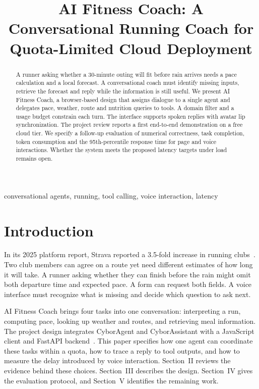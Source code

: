 \documentclass[conference]{IEEEtran}
\begin{document}
\title{AI Fitness Coach: A Conversational Running Coach for Quota-Limited Cloud Deployment}
\author{}
\maketitle
\begin{abstract}
A runner asking whether a 30-minute outing will fit before rain arrives needs a pace calculation and a local forecast. A conversational coach must identify missing inputs, retrieve the forecast and reply while the information is still useful. We present AI Fitness Coach, a browser-based design that assigns dialogue to a single agent and delegates pace, weather, route and nutrition queries to tools. A domain filter and a usage budget constrain each turn. The interface supports spoken replies with avatar lip synchronization. The project review reports a first end-to-end demonstration on a free cloud tier. We specify a follow-up evaluation of numerical correctness, task completion, token consumption and the 95th-percentile response time for page and voice interactions. Whether the system meets the proposed latency targets under load remains open.
\end{abstract}
\begin{IEEEkeywords}
conversational agents, running, tool calling, voice interaction, latency
\end{IEEEkeywords}
\section{Introduction}
In its 2025 platform report, Strava reported a 3.5-fold increase in running clubs~\cite{strava}. Two club members can agree on a route yet need different estimates of how long it will take. A runner asking whether they can finish before the rain might omit both departure time and expected pace. A form can request both fields. A voice interface must recognize what is missing and decide which question to ask next.

AI Fitness Coach brings four tasks into one conversation: interpreting a run, computing pace, looking up weather and routes, and retrieving meal information. The project design integrates CyborAgent and CyborAssistant with a JavaScript client and FastAPI backend~\cite{project}. This paper specifies how one agent can coordinate these tasks within a quota, how to trace a reply to tool outputs, and how to measure the delay introduced by voice interaction. Section~II reviews the evidence behind these choices. Section~III describes the design. Section~IV gives the evaluation protocol, and Section~V identifies the remaining work.
\end{document}
